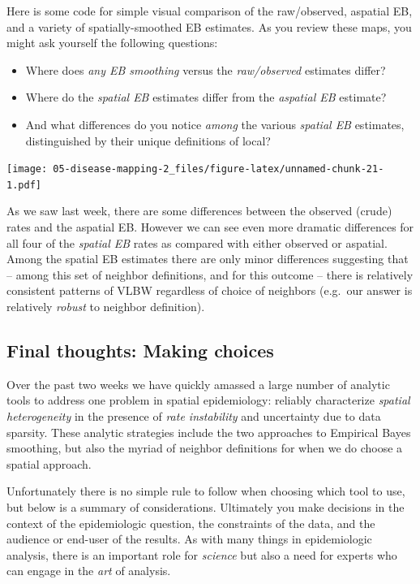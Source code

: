 \documentclass[
]{book}
\providecommand{\tightlist}{%
  \setlength{\itemsep}{0pt}\setlength{\parskip}{0pt}}
\begin{document}
Here is some code for simple visual comparison of the raw/observed, aspatial EB, and a variety of spatially-smoothed EB estimates. As you review these maps, you might ask yourself the following questions:

\begin{itemize}
\tightlist
\item
  Where does \emph{any EB smoothing} versus the \emph{raw/observed} estimates differ?
\item
  Where do the \emph{spatial EB} estimates differ from the \emph{aspatial EB} estimate?
\item
  And what differences do you notice \emph{among} the various \emph{spatial EB} estimates, distinguished by their unique definitions of local?
\end{itemize}

\texttt{[image: 05-disease-mapping-2\_files/figure-latex/unnamed-chunk-21-1.pdf]}

As we saw last week, there are some differences between the observed (crude) rates and the aspatial EB. However we can see even more dramatic differences for all four of the \emph{spatial EB} rates as compared with either observed or aspatial. Among the spatial EB estimates there are only minor differences suggesting that -- among this set of neighbor definitions, and for this outcome -- there is relatively consistent patterns of VLBW regardless of choice of neighbors (e.g.~our answer is relatively \emph{robust} to neighbor definition).

\hypertarget{final-thoughts-making-choices}{%
\subsection{Final thoughts: Making choices}\label{final-thoughts-making-choices}}

Over the past two weeks we have quickly amassed a large number of analytic tools to address one problem in spatial epidemiology: reliably characterize \emph{spatial heterogeneity} in the presence of \emph{rate instability} and uncertainty due to data sparsity. These analytic strategies include the two approaches to Empirical Bayes smoothing, but also the myriad of neighbor definitions for when we do choose a spatial approach.

Unfortunately there is no simple rule to follow when choosing which tool to use, but below is a summary of considerations. Ultimately you make decisions in the context of the epidemiologic question, the constraints of the data, and the audience or end-user of the results. As with many things in epidemiologic analysis, there is an important role for \emph{science} but also a need for experts who can engage in the \emph{art} of analysis.
\end{document}

